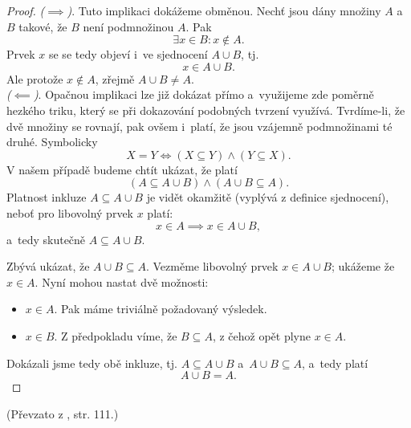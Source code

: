 \begin{proof}
    \textit{($\implies$)}. Tuto implikaci dokážeme obměnou. Nechť jsou dány množiny $A$ a~$B$ takové, že $B$ není podmnožinou $A$. Pak
    \begin{equation*}
        \exists x\in B : x\notin A.
    \end{equation*}
    Prvek $x$ se se tedy objeví i~ve sjednocení $A \cup B$, tj.
    \begin{equation*}
        x\in A \cup B.
    \end{equation*}
    Ale protože $x\notin A$, zřejmě $A \cup B \neq A$.\\
    \textit{($\impliedby$)}. Opačnou implikaci lze již dokázat přímo a~využijeme zde poměrně hezkého triku, který se při dokazování podobných tvrzení využívá. Tvrdíme-li, že dvě množiny se rovnají, pak ovšem i~platí, že jsou vzájemně podmnožinami té druhé. Symbolicky
    \begin{equation*}
        X = Y \iff (X \subseteq Y) \land (Y \subseteq X).
    \end{equation*}
    V našem případě budeme chtít ukázat, že platí
    \begin{equation*}
        (A \subseteq A \cup B) \land (A \cup B \subseteq A).
    \end{equation*}
    Platnost inkluze $A \subseteq A \cup B$ je vidět okamžitě (vyplývá z definice sjednocení), neboť pro libovolný prvek $x$ platí:
    \begin{equation*}
        x \in A \implies x \in A \cup B,
    \end{equation*}
    a~tedy skutečně $A \subseteq A \cup B$.\par
    Zbývá ukázat, že $A \cup B \subseteq A$. Vezměme libovolný prvek $x \in A \cup B$; ukážeme že $x\in A$. Nyní mohou nastat dvě možnosti:
    \begin{itemize}
        \item $x \in A$. Pak máme triviálně požadovaný výsledek.
        \item $x \in B$. Z předpokladu víme, že $B \subseteq A$, z čehož opět plyne $x\in A$.
    \end{itemize}
    Dokázali jsme tedy obě inkluze, tj. $A \subseteq A \cup B$ a~$A \cup B \subseteq A$, a~tedy platí
    \begin{equation*}
        A \cup B = A.
    \end{equation*}
\end{proof}
(Převzato z \cite{ChartrandPolimeniZhang2014}, str. 111.)
